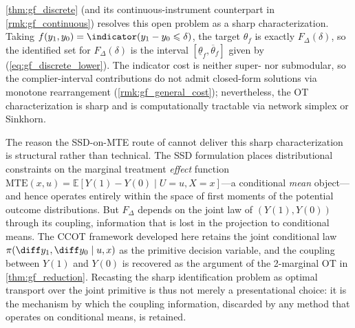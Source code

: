 \cref{thm:gf_discrete} (and its continuous-instrument counterpart in \cref{rmk:gf_continuous}) resolves this open problem as a sharp characterization. Taking $f(y_1, y_0) = \indicator(y_1 - y_0 \leqslant \delta)$, the target $\theta_f$ is exactly $F_\Delta(\delta)$, so the identified set for $F_\Delta(\delta)$ is the interval $[\underline{\theta}_f, \overline{\theta}_f]$ given by (\ref{eq:gf_discrete_lower}). The indicator cost is neither super- nor submodular, so the complier-interval contributions do not admit closed-form solutions via monotone rearrangement (\cref{rmk:gf_general_cost}); nevertheless, the OT characterization is sharp and is computationally tractable via network simplex or Sinkhorn.

The reason the SSD-on-MTE route of \citet{marx2024sharp} cannot deliver this sharp characterization is structural rather than technical. The SSD formulation places distributional constraints on the marginal treatment \emph{effect} function $\mathrm{MTE}(x, u) = \mathbb{E}[Y(1) - Y(0) \mid U = u, X = x]$---a conditional \emph{mean} object---and hence operates entirely within the space of first moments of the potential outcome distributions. But $F_\Delta$ depends on the joint law of $(Y(1), Y(0))$ through its coupling, information that is lost in the projection to conditional means. The CCOT framework developed here retains the joint conditional law $\pi(\diff y_1, \diff y_0 \mid u, x)$ as the primitive decision variable, and the coupling between $Y(1)$ and $Y(0)$ is recovered as the argument of the 2-marginal OT in \cref{thm:gf_reduction}. Recasting the sharp identification problem as optimal transport over the joint primitive is thus not merely a presentational choice: it is the mechanism by which the coupling information, discarded by any method that operates on conditional means, is retained.
